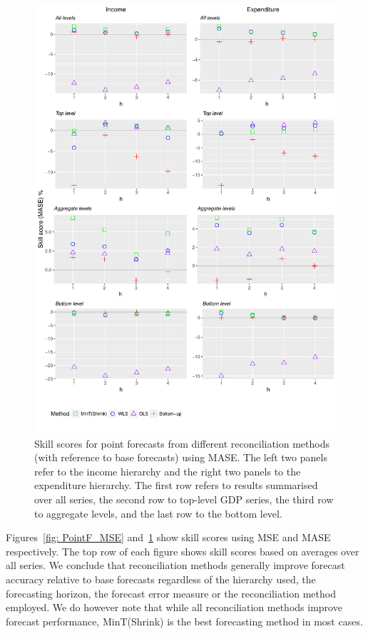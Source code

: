 \documentclass[graybox]{svmult}
\begin{document}
\begin{figure}
	\centering
	\small
	\includegraphics[width=\textwidth]{Figs/Results/PointF_MASE.pdf}
	\caption{Skill scores for point forecasts from different reconciliation methods (with reference to base forecasts) using MASE\@. The left two panels refer to the income hierarchy and the right two panels to the expenditure hierarchy. The first row refers to results summarised over all series, the second row to top-level GDP series, the third row to aggregate levels, and the last row to the bottom level.}
	\label{fig: PointF_MASE}
\end{figure}

Figures~\ref{fig: PointF_MSE} and~\ref{fig: PointF_MASE} show skill scores using MSE and MASE respectively. The top row of each figure shows skill scores based on averages over all series. We conclude that reconciliation methods generally improve forecast accuracy relative to base forecasts regardless of the hierarchy used, the forecasting horizon, the forecast error measure or the reconciliation method employed. We do however note that while all reconciliation methods improve forecast performance, MinT(Shrink) is the best forecasting method in most cases.
\end{document}
